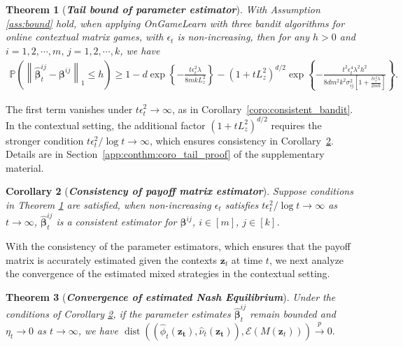 \documentclass[12pt]{article}
\newtheorem{theorem}{Theorem}
\newtheorem{corollary}[theorem]{Corollary}
\begin{document}
\begin{theorem}[{\textbf{\emph{Tail bound of parameter estimator}}}]
\label{conthm:tail}
With Assumption \ref{ass:bound} hold, when applying OnGameLearn with three bandit algorithms for online contextual matrix games, with $\epsilon_t$ is non-increasing, then for any $h > 0$ and $i=1,2,\cdots,m,\, j =1,2,\cdots,k$, we have
\small{
\begin{align*}
\mathbb P\left(
\left\|
\widehat{\bm\beta}_t^{ij}
-
\bm\beta^{ij}
\right\|_1
\le
h\right) \ge
1-d\exp\left\{
-
\frac{
t\epsilon_t^2\lambda}{
8mkL_z^2}
\right\}
-
\left(
1+tL_z^2
\right)^{d/2}
\exp\left\{
-
\frac{
t^2\epsilon_t^4\lambda^2h^2}{8dm^2k^2\sigma_{ij}^2
\left[
1+\frac{t\epsilon_t^2\lambda}{2mk}
\right]
}
\right\}.
\end{align*}
}
\end{theorem}
The first term vanishes under $t\epsilon_t^2\to\infty$, as in Corollary~\ref{coro:consistent_bandit}. In the contextual setting, the additional factor $\left(1+tL_z^2\right)^{d/2}$ requires the stronger condition ${t\epsilon_t^2}/{\log t}\to\infty$, which ensures consistency in Corollary~\ref{concoro:consistent}. Details are in Section~\ref{app:conthm:coro_tail_proof} of the supplementary material.


\begin{corollary}[{\textbf{\emph{Consistency of payoff matrix estimator}}}]
\label{concoro:consistent}
Suppose conditions in Theorem \ref{conthm:tail} are satisfied, when non-increasing $\epsilon_t$ satisfies $t\epsilon_t^2/\log t \to \infty$ as $t \to \infty$, $\widehat{\bm{\beta}}_t^{ij}$ is a consistent estimator for $\bm{\beta}^{ij}$, $i \in [m]$, $j \in [k]$.
\end{corollary}

With the consistency of the parameter estimators, which ensures that the payoff matrix is accurately estimated given the contexts $\bm{z}_t$ at time $t$, we next analyze the convergence of the estimated mixed strategies in the contextual setting. 


\begin{theorem}[{\textbf{\emph{Convergence of estimated Nash Equilibrium}}}]
\label{conthm:nash_con}
Under the conditions of Corollary \ref{concoro:consistent}, if the parameter estimates $\widehat{\bm{\beta}}^{ij}_t$ remain bounded and $\eta_t \to 0$ as $t \to \infty$, we have
    $\operatorname{dist} \left( (\widehat{\phi}_t(\bm{z_t}), \widehat{\nu}_t(\bm{z_t})),\mathcal{E}(M(\bm{z}_t)) \right) \stackrel{p}{\to} 0.$
\end{theorem}
\end{document}

